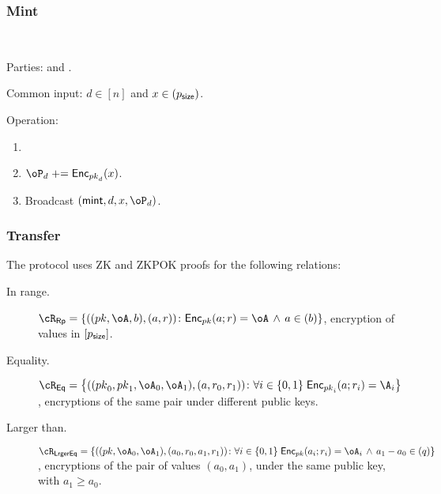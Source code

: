 \subsubsection{Mint}

\begin{protocol}~\label{prot:ConfidentialTransactions:Mint}
	\item[Parties:] \Mc and \Cc.
	
	
	
	\item[Common input:]  $d\in [n]$ and $x\in (p_{\mathsf{size}})$.
	
	\item[Operation:]  \Cc~

		\begin{enumerate}
			\item {}
			
			\item  $\oP_d \pluseq \Enc_{\pk_d}(x)$.
				
			
			\item Broadcast 	 	$(\mint,d,x,\oP_d)$.
		
	\end{enumerate}
\end{protocol}

\subsubsection{Transfer}

The protocol uses ZK and ZKPOK proofs for the   following  relations:

\begin{description}
	\item[In range.] $\rRp =\rRpDef$, \ie  encryption of values in $[p_{\mathsf{size}}]$.
	
	\item[Equality.] $\rEq =\rEqDef$, \ie  encryptions of the same pair under different public keys.
	
	\item[Larger than.] $\rLrgEq =\rLrgEqDef$, \ie encryptions of the  pair of values $(a_0,a_1)$, under the same public key, with $a_1 \ge a_0$.
\end{description}




